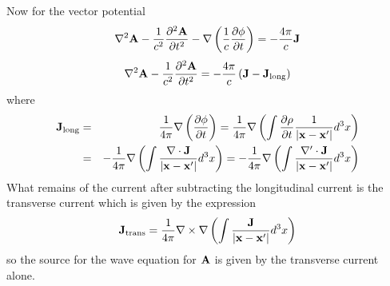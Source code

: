\documentclass{article}
\begin{document}
\begin{enumerate}
Now for the vector potential
$$
\nabla^2 {\bf A} - \frac{1}{c^2} \frac{\partial {^2 {\bf A}}}{\partial {t^2}} - \nabla \left
  ( \frac{1}{c} \frac{\partial {\phi}}{\partial {t}} \right ) = -\frac{4\pi}{c} {\bf J}
$$
$$
\nabla^2 {\bf A} - \frac{1}{c^2} \frac{\partial {^2 {\bf A}}}{\partial {t^2}}  =
-\frac{4\pi}{c} \left ( {\bf J} - {\bf J}_\mathrm{long} \right )
$$
where
\begin{eqnarray*}
{\bf J}_\mathrm{long} &=& \frac{1}{4\pi} \nabla \left
  ( \frac{\partial {\phi}}{\partial {t}} \right ) =  \frac{1}{4\pi} \nabla \left 
  ( \int \frac{\partial {\rho}}{\partial {t}} \frac{1}{\left |{\bf x} - {\bf x}'\right|} d^3 x
\right ) \\
&=& -\frac{1}{4\pi} \nabla \left 
  ( \int \frac{\nabla \cdot {\bf J}}{\left |{\bf x} - {\bf x}'\right|} d^3 x
\right )  = -\frac{1}{4\pi} \nabla \left 
  ( \int \frac{\nabla' \cdot {\bf J}}{\left |{\bf x} - {\bf x}'\right|} d^3 x
\right )  
\end{eqnarray*}
What remains of the current after subtracting the longitudinal current
is the transverse current which is given by the expression
$$
{\bf J}_\mathrm{trans} = \frac{1}{4\pi} \nabla \times \nabla \left 
  ( \int \frac{{\bf J}}{\left |{\bf x} - {\bf x}'\right|} d^3 x
\right )  
$$
so the source for the wave equation for ${\bf A}$ is given by the
transverse current alone.
\end{enumerate}

\ifx\bookloaded\undefined
\end{document}
